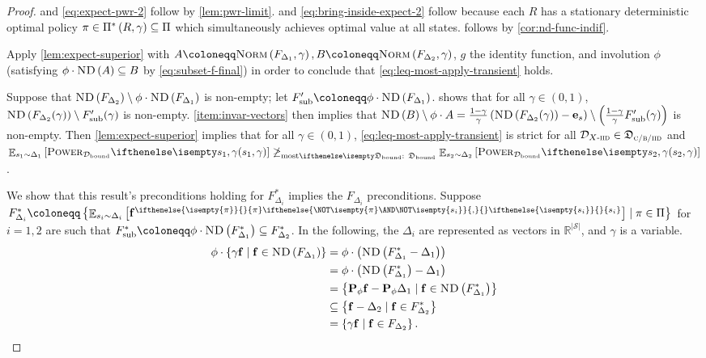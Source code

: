 \documentclass{article}
\renewcommand{\abs}[1]{\left|#1\right|}
\newcommand*{\prn}[1]{\left(#1\right)}
\newcommand*{\brx}[1]{\left[#1\right]}
\renewcommand{\set}[1]{\left\{#1\right\}}
\newcommand*{\defeq}{\coloneqq} %
\newcommand*{\reals}{\mathbb{R}}
\newcommand*{\unitvec}[1][s]{\mathbf{e}_{#1}}
\newcommand*{\permute}[1][\phi]{\mathbf{P}_{#1}} %
\newcommand*{\upsc}[1]{\text{\upshape\textsc{#1}}}
\newcommand*{\St}{\mathcal{S}}
\newcommand*{\rewardVS}{\reals^{\abs{\St}}} %
\newcommand*{\optPi}{\piSet[*]}
\newcommand*{\D}{\mathcal{D}} %
\newcommand*{\distSet}{\mathfrak{D}}
\newcommand*{\DSetBCiid}{\distSet_{\textsc{c/b/}\iid}}
\newcommand*{\Dbd}{\D_{\text{bound}}}
\newcommand*{\DSetBd}{\distSet_\text{bound}}
\DeclareMathOperator*{\opE}{\mathbb{E}}
\newcommand*{\E}[2]{\opE_{#1}\brx{#2}} %
\newcommand*{\f}{\mathbf{f}} %
\newcommand*{\fpi}[2][\pi]{\f^{
\ifthenelse{\isempty{#1}}{}{#1} %
\ifthenelse{\NOT\isempty{#1} \AND \NOT\isempty{#2}}{,}{} %
\ifthenelse{\isempty{#2}}{}{#2}}} %
\newcommand*{\ND}[1]{\upsc{ND}\prn{#1}}
\newcommand*{\NormF}[1]{\upsc{Norm}\prn{#1}}
\theoremstyle{definition}
\begin{document}
\begin{appendices}
\begin{proof}
 and \cref{eq:expect-pwr-2} follow by \cref{lem:pwr-limit}.  and \cref{eq:bring-inside-expect-2} follow because each $R$ has a stationary deterministic optimal policy $\pi\in \optPi\subseteq \Pi$ which simultaneously achieves  optimal value at all states.  follows by \cref{cor:nd-func-indif}.

Apply \cref{lem:expect-superior} with $A\defeq \NormF{F_{\Delta_1},\gamma}, B \defeq \NormF{F_{\Delta_2},\gamma}$, $g$ the identity function, and involution $\phi$ (satisfying $\phi\cdot \ND{A}\subseteq B$ by \cref{eq:subset-f-final}) in order to conclude that \cref{eq:leq-most-apply-transient} holds. 

Suppose that $\ND{F_{\Delta_2}}\setminus \phi\cdot \ND{F_{\Delta_1}}$ is non-empty; let $F_\text{sub}'\defeq \phi\cdot \ND{F_{\Delta_1}}$.  shows that for all $\gamma\in(0,1)$, $\ND{F_{\Delta_2}(\gamma)}\setminus F_\text{sub}'(\gamma)$ is non-empty.  \cref{item:invar-vectors} then implies that $\ND{B}\setminus \phi\cdot A=\frac{1-\gamma}{\gamma}\prn{\ND{F_{\Delta_2}(\gamma)}-\unitvec}\setminus \prn{\frac{1-\gamma}{\gamma}F'_\text{sub}(\gamma)}$ is non-empty. Then \cref{lem:expect-superior} implies that for all $\gamma\in(0,1)$, \cref{eq:leq-most-apply-transient} is strict for all $\Diid\in\DSetBCiid$ and $\E{s_1\sim \Delta_1}{\pwr[s_1,\gamma][\Dbd]}\not\geqMost[][\DSetBd] \E{s_2\sim \Delta_2}{\pwr[s_2,\gamma][\Dbd]}$. 

We show that this result's preconditions holding for  $F_{\Delta_i}^*$ implies the $F_{\Delta_i}$ preconditions. Suppose $F_{\Delta_i}^*\defeq \set{\E{s_i\sim \Delta_i}{\fpi{s_i}}\mid \pi\in\Pi}$ for $i=1,2$ are such that $F_\text{sub}^*\defeq \phi\cdot \ND{F_{\Delta_1}^*}\subseteq F_{\Delta_2}^*$. In the following, the $\Delta_i$ are represented as vectors in $\rewardVS$, and $\gamma$ is a variable.
\begin{align}
    \phi\cdot \set{\gamma\f\mid \f \in \ND{F_{\Delta_1}}}&=\phi\cdot \prn{\ND{F_{\Delta_1}^*-\Delta_1}}\\
    &=\phi\cdot\prn{\ND{F_{\Delta_1}^*}-\Delta_1}\label{eq:invariant-vec-fn-set}\\
    &=\set{\permute \f - \permute\Delta_1\mid \f\in \ND{F_{\Delta_1}^*}}\\
    &\subseteq \set{\f-\Delta_2 \mid \f\in F_{\Delta_2}^*}\label{eq:fsub-no-state}\\
    &=\set{\gamma\f\mid \f \in F_{\Delta_2}}.\label{eq:gamma-sim}
\end{align}


\end{proof}
\end{appendices}
\end{document}
